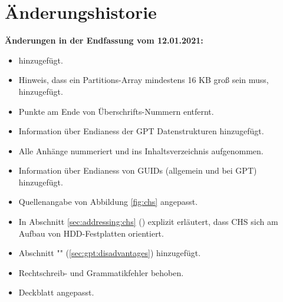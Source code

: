 \section{Änderungshistorie}
\label{sec:changelog}

\textbf{Änderungen in der Endfassung vom 12.01.2021:}

\begin{itemize}
    \item {} hinzugefügt.

    \item Hinweis, dass ein Partitions-Array mindestens 16 KB groß sein muss, hinzugefügt.

    \item Punkte am Ende von Überschrifts-Nummern entfernt.

    \item Information über Endianess der GPT Datenstrukturen hinzugefügt.
    
    \item Alle Anhänge nummeriert und ins Inhaltsverzeichnis aufgenommen.
    
    \item Information über Endianess von GUIDs (allgemein und bei GPT) hinzugefügt.
    
    \item Quellenangabe von Abbildung \ref{fig:chs} angepasst.
    
    \item In Abschnitt \ref{sec:addressing:chs} () explizit erläutert, dass CHS sich am Aufbau von HDD-Festplatten orientiert.
    
    \item Abschnitt "" (\ref{sec:gpt:disadvantages}) hinzugefügt.
    
    \item Rechtschreib- und Grammatikfehler behoben.
    
    \item Deckblatt angepasst.
\end{itemize}
